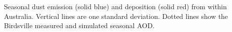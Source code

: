 \label{fig:seasonaldust}
Seasonal dust emission (solid blue) and deposition (solid red) from within Australia.
Vertical lines are one standard deviation.
Dotted lines show the Birdsville measured and simulated seasonal AOD.
